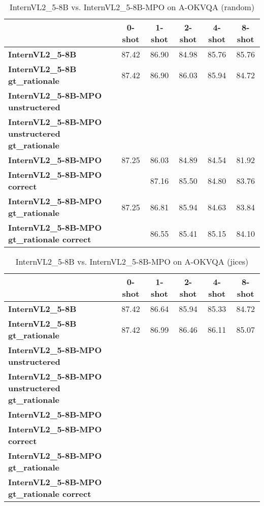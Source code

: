 \begin{table}
\caption{InternVL2\_5-8B vs. InternVL2\_5-8B-MPO on A-OKVQA (random)}
\label{tab:InternVL2_5-8B_A-OKVQA_TRAIN_random}
\begin{tabular}{lccccc}
\toprule
 & 0-shot & 1-shot & 2-shot & 4-shot & 8-shot \\
\midrule
\textbf{InternVL2\_5-8B} & 87.42 & 86.90 & 84.98 & 85.76 & 85.76 \\
\textbf{InternVL2\_5-8B gt\_rationale} & 87.42 & 86.90 & 86.03 & 85.94 & 84.72 \\
\textbf{InternVL2\_5-8B-MPO unstructered} &  &  &  &  &  \\
\textbf{InternVL2\_5-8B-MPO unstructered gt\_rationale} &  &  &  &  &  \\
\textbf{InternVL2\_5-8B-MPO} & 87.25 & 86.03 & 84.89 & 84.54 & 81.92 \\
\textbf{InternVL2\_5-8B-MPO correct} &  & 87.16 & 85.50 & 84.80 & 83.76 \\
\textbf{InternVL2\_5-8B-MPO gt\_rationale} & 87.25 & 86.81 & 85.94 & 84.63 & 83.84 \\
\textbf{InternVL2\_5-8B-MPO gt\_rationale correct} &  & 86.55 & 85.41 & 85.15 & 84.10 \\
\bottomrule
\end{tabular}
\end{table}


\begin{table}
\caption{InternVL2\_5-8B vs. InternVL2\_5-8B-MPO on A-OKVQA (jices)}
\label{tab:InternVL2_5-8B_A-OKVQA_TRAIN_jices}
\begin{tabular}{lccccc}
\toprule
 & 0-shot & 1-shot & 2-shot & 4-shot & 8-shot \\
\midrule
\textbf{InternVL2\_5-8B} & 87.42 & 86.64 & 85.94 & 85.33 & 84.72 \\
\textbf{InternVL2\_5-8B gt\_rationale} & 87.42 & 86.99 & 86.46 & 86.11 & 85.07 \\
\textbf{InternVL2\_5-8B-MPO unstructered} &  &  &  &  &  \\
\textbf{InternVL2\_5-8B-MPO unstructered gt\_rationale} &  &  &  &  &  \\
\textbf{InternVL2\_5-8B-MPO} &  &  &  &  &  \\
\textbf{InternVL2\_5-8B-MPO correct} &  &  &  &  &  \\
\textbf{InternVL2\_5-8B-MPO gt\_rationale} &  &  &  &  &  \\
\textbf{InternVL2\_5-8B-MPO gt\_rationale correct} &  &  &  &  &  \\
\bottomrule
\end{tabular}
\end{table}


